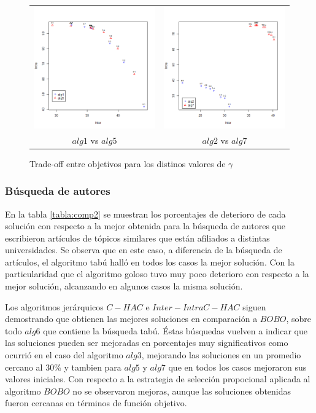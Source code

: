 \begin{figure}[H]
	\centering
	\begin{tabular}{cc}
			\includegraphics[width=0.45\linewidth]{img/alg1_vs_alg5.png}&
			\includegraphics[width=0.45\linewidth]{img/alg2_vs_alg7.png}\\
			$alg1$ vs $alg5$ & $alg2$ vs $alg7$\\
	\end{tabular}
	\caption{Trade-off entre objetivos para los distinos valores de $\gamma$}
	\label{res:inter_intra}
\end{figure}

\subsubsection{Búsqueda de autores}
En la tabla \ref{tabla:comp2} se muestran los porcentajes de deterioro de cada solución con respecto a la mejor obtenida para la búsqueda de autores que escribieron artículos de tópicos similares que están afiliados a distintas universidades. Se observa que en este caso, a diferencia de la búsqueda de artículos, el algoritmo tabú halló en todos los casos la mejor solución. Con la particularidad que el algoritmo goloso tuvo muy poco deterioro con respecto a la mejor solución, alcanzando en algunos casos la misma solución.

Los algoritmos jerárquicos $C-HAC$ e $Inter-Intra C-HAC$ siguen demostrando que obtienen las mejores soluciones en comparación a $BOBO$, sobre todo $alg6$ que contiene la búsqueda tabú. Éstas búsquedas vuelven a indicar que las soluciones pueden ser mejoradas en porcentajes muy significativos como ocurrió en el caso del algoritmo $alg3$, mejorando las soluciones en un promedio cercano al $30\%$ y tambien para $alg5$ y $alg7$ que en todos los casos mejoraron sus valores iniciales. Con respecto a la estrategia de selección propocional aplicada al algoritmo $BOBO$ no se observaron mejoras, aunque las soluciones obtenidas fueron cercanas en términos de función objetivo. 


